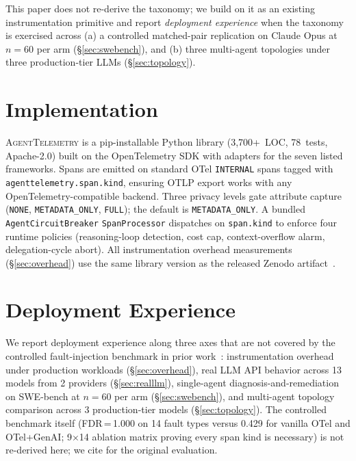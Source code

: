 \documentclass[11pt]{article}
\begin{document}
This paper does not re-derive the taxonomy; we build on it as an
existing instrumentation primitive and report \emph{deployment
experience} when the taxonomy is exercised across (a) a controlled
matched-pair replication on Claude Opus at $n{=}60$ per arm
(\S\ref{sec:swebench}), and (b) three multi-agent topologies under three
production-tier LLMs (\S\ref{sec:topology}).

\section{Implementation}
\label{sec:implementation}

\textsc{AgentTelemetry} is a pip-installable Python library
(3,700+~LOC, 78~tests, Apache-2.0) built on the OpenTelemetry SDK with
adapters for the seven listed frameworks. Spans are emitted on standard
OTel \texttt{INTERNAL} spans tagged with
\texttt{agenttelemetry.span.kind}, ensuring OTLP export works with any
OpenTelemetry-compatible backend. Three privacy levels gate attribute
capture (\texttt{NONE}, \texttt{METADATA\_ONLY}, \texttt{FULL}); the
default is \texttt{METADATA\_ONLY}. A bundled
\texttt{AgentCircuitBreaker} \texttt{SpanProcessor} dispatches on
\texttt{span.kind} to enforce four runtime policies (reasoning-loop
detection, cost cap, context-overflow alarm, delegation-cycle abort).
All instrumentation overhead measurements (\S\ref{sec:overhead}) use
the same library version as the released Zenodo
artifact~\citep{aiware2026}.

\section{Deployment Experience}
\label{sec:evaluation}

We report deployment experience along three axes that are not covered
by the controlled fault-injection benchmark in prior
work~\citep{aiware2026}: instrumentation overhead under production
workloads (\S\ref{sec:overhead}), real LLM API behavior across 13
models from 2 providers (\S\ref{sec:realllm}), single-agent
diagnosis-and-remediation on SWE-bench at $n{=}60$ per arm
(\S\ref{sec:swebench}), and multi-agent topology comparison across 3
production-tier models (\S\ref{sec:topology}). The controlled
benchmark itself (FDR\,=\,1.000 on 14 fault types versus 0.429 for
vanilla OTel and OTel+GenAI; 9$\times$14 ablation matrix proving every
span kind is necessary) is not re-derived here; we cite
\citet{aiware2026} for the original evaluation.
\end{document}

